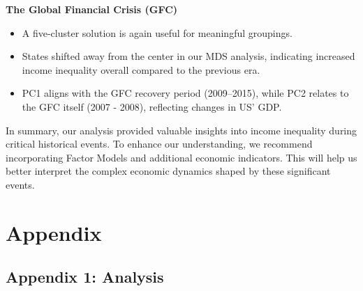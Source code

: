 \documentclass[11pt,a4paper,]{article}
\providecommand{\tightlist}{%
  \setlength{\itemsep}{0pt}\setlength{\parskip}{0pt}}
\begin{document}
\textbf{The Global Financial Crisis (GFC)}

\begin{itemize}
\tightlist
\item
  A five-cluster solution is again useful for meaningful groupings.\\
\item
  States shifted away from the center in our MDS analysis, indicating increased income inequality overall compared to the previous era.
\item
  PC1 aligns with the GFC recovery period (2009--2015), while PC2 relates to the GFC itself (2007 - 2008), reflecting changes in US' GDP.
\end{itemize}

In summary, our analysis provided valuable insights into income inequality during critical historical events. To enhance our understanding, we recommend incorporating Factor Models and additional economic indicators. This will help us better interpret the complex economic dynamics shaped by these significant events.

\newpage

\hypertarget{appendix}{%
\section{Appendix}\label{appendix}}

\hypertarget{appendix-1-analysis}{%
\subsection{Appendix 1: Analysis}\label{appendix-1-analysis}}

\begingroup\fontsize{8}{10}\selectfont
\end{document}
